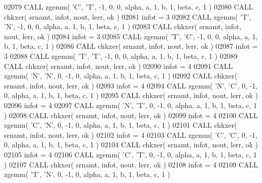 \begin{DoxyCode}
02079       \textcolor{keyword}{CALL }zgemm( \textcolor{stringliteral}{'C'}, \textcolor{stringliteral}{'T'}, -1, 0, 0, alpha, a, 1, b, 1, beta, c, 1 )
02080       \textcolor{keyword}{CALL }chkxer( srnamt, infot, nout, lerr, ok )
02081       infot = 3
02082       \textcolor{keyword}{CALL }zgemm( \textcolor{stringliteral}{'T'}, \textcolor{stringliteral}{'N'}, -1, 0, 0, alpha, a, 1, b, 1, beta, c, 1 )
02083       \textcolor{keyword}{CALL }chkxer( srnamt, infot, nout, lerr, ok )
02084       infot = 3
02085       \textcolor{keyword}{CALL }zgemm( \textcolor{stringliteral}{'T'}, \textcolor{stringliteral}{'C'}, -1, 0, 0, alpha, a, 1, b, 1, beta, c, 1 )
02086       \textcolor{keyword}{CALL }chkxer( srnamt, infot, nout, lerr, ok )
02087       infot = 3
02088       \textcolor{keyword}{CALL }zgemm( \textcolor{stringliteral}{'T'}, \textcolor{stringliteral}{'T'}, -1, 0, 0, alpha, a, 1, b, 1, beta, c, 1 )
02089       \textcolor{keyword}{CALL }chkxer( srnamt, infot, nout, lerr, ok )
02090       infot = 4
02091       \textcolor{keyword}{CALL }zgemm( \textcolor{stringliteral}{'N'}, \textcolor{stringliteral}{'N'}, 0, -1, 0, alpha, a, 1, b, 1, beta, c, 1 )
02092       \textcolor{keyword}{CALL }chkxer( srnamt, infot, nout, lerr, ok )
02093       infot = 4
02094       \textcolor{keyword}{CALL }zgemm( \textcolor{stringliteral}{'N'}, \textcolor{stringliteral}{'C'}, 0, -1, 0, alpha, a, 1, b, 1, beta, c, 1 )
02095       \textcolor{keyword}{CALL }chkxer( srnamt, infot, nout, lerr, ok )
02096       infot = 4
02097       \textcolor{keyword}{CALL }zgemm( \textcolor{stringliteral}{'N'}, \textcolor{stringliteral}{'T'}, 0, -1, 0, alpha, a, 1, b, 1, beta, c, 1 )
02098       \textcolor{keyword}{CALL }chkxer( srnamt, infot, nout, lerr, ok )
02099       infot = 4
02100       \textcolor{keyword}{CALL }zgemm( \textcolor{stringliteral}{'C'}, \textcolor{stringliteral}{'N'}, 0, -1, 0, alpha, a, 1, b, 1, beta, c, 1 )
02101       \textcolor{keyword}{CALL }chkxer( srnamt, infot, nout, lerr, ok )
02102       infot = 4
02103       \textcolor{keyword}{CALL }zgemm( \textcolor{stringliteral}{'C'}, \textcolor{stringliteral}{'C'}, 0, -1, 0, alpha, a, 1, b, 1, beta, c, 1 )
02104       \textcolor{keyword}{CALL }chkxer( srnamt, infot, nout, lerr, ok )
02105       infot = 4
02106       \textcolor{keyword}{CALL }zgemm( \textcolor{stringliteral}{'C'}, \textcolor{stringliteral}{'T'}, 0, -1, 0, alpha, a, 1, b, 1, beta, c, 1 )
02107       \textcolor{keyword}{CALL }chkxer( srnamt, infot, nout, lerr, ok )
02108       infot = 4
02109       \textcolor{keyword}{CALL }zgemm( \textcolor{stringliteral}{'T'}, \textcolor{stringliteral}{'N'}, 0, -1, 0, alpha, a, 1, b, 1, beta, c, 1 )

\end{DoxyCode}
